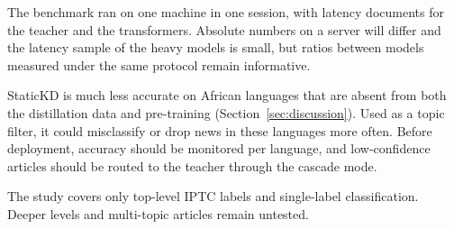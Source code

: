 The benchmark ran on one machine in one session, with  latency documents for the teacher and the transformers. Absolute numbers on a server will differ and the latency sample of the heavy models is small, but ratios between models measured under the same protocol remain informative.

StaticKD is much less accurate on African languages that are absent from both the distillation data and pre-training (Section~\ref{sec:discussion}). Used as a topic filter, it could misclassify or drop news in these languages more often. Before deployment, accuracy should be monitored per language, and low-confidence articles should be routed to the teacher through the cascade mode.

The study covers only top-level IPTC labels and single-label classification. Deeper levels and multi-topic articles remain untested.
